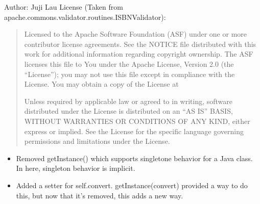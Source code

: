 \documentclass[letterpaper,10pt,english]{sphinxmanual}
\begin{document}
\sphinxAtStartPar
Author: Juji Lau
License (Taken from apache.commons.validator.routines.ISBNValidator):
\begin{quote}

\sphinxAtStartPar
Licensed to the Apache Software Foundation (ASF) under one or more
contributor license agreements. See the NOTICE file distributed with
this work for additional information regarding copyright ownership.
The ASF licenses this file to You under the Apache License, Version 2.0
(the “License”); you may not use this file except in compliance with
the License. You may obtain a copy of the License at
\begin{quote}

\sphinxAtStartPar
{}
\end{quote}

\sphinxAtStartPar
Unless required by applicable law or agreed to in writing, software
distributed under the License is distributed on an “AS IS” BASIS,
WITHOUT WARRANTIES OR CONDITIONS OF ANY KIND, either express or implied.
See the License for the specific language governing permissions and
limitations under the License.
\end{quote}
\begin{description}
\begin{itemize}
\item {} 
\sphinxAtStartPar
Removed getInstance() which supports singletone behavior for a Java class.  In here, singleton behavior is implicit.

\item {} 
\sphinxAtStartPar
Added a setter for self.convert.  getInstance(convert) provided a way to do this, but now that it’s removed, this adds a new way.

\end{itemize}

\end{description}
\end{document}
